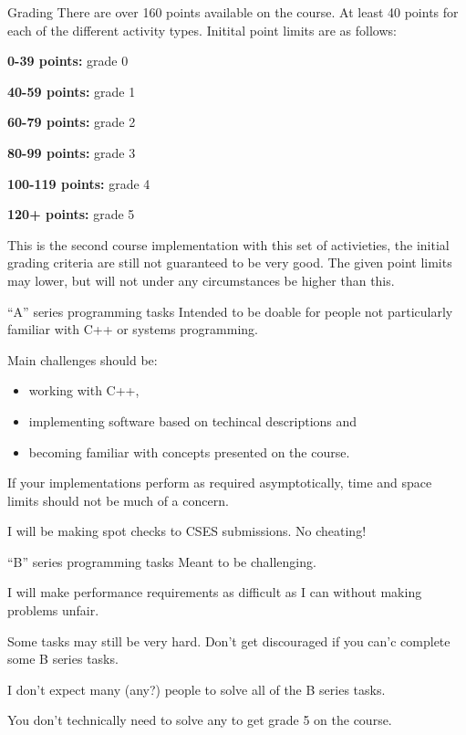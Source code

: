 \documentclass[11pt, aspectratio=169, table]{beamer}
\begin{document}
\begin{frame}{Grading}
There are over 160 points available on the course. At least 40 points for each of the different
activity types. Initital point limits are as follows:
\begin{description}
\item{{\bf 0-39 points:}} grade 0
\item{{\bf 40-59 points:}} grade 1
\item{{\bf 60-79 points:}} grade 2
\item{{\bf 80-99 points:}} grade 3
\item{{\bf 100-119 points:}} grade 4
\item{{\bf 120+ points:}} grade 5
\end{description}

This is the second course implementation with this set of activieties, the initial grading criteria 
are still not guaranteed to be very good. The given point limits may lower, but will not under any 
circumstances be higher than this.
\end{frame}

\begin{frame}{``A'' series programming tasks}
\setlength\parskip{\fill}
Intended to be doable for people not particularly familiar with C++ or systems programming.

Main challenges should be:
\begin{itemize}
	\item working with C++,
	\item implementing software based on techincal descriptions and
	\item becoming familiar with concepts presented on the course.
\end{itemize}

If your implementations perform as required asymptotically, time and space limits should not be much of a concern.

I will be making spot checks to CSES submissions. No cheating!
\end{frame}

\begin{frame}{``B'' series programming tasks} 
\setlength\parskip{\fill}
Meant to be challenging.

I will make performance requirements as difficult as I can without making problems unfair.

Some tasks may still be very hard. Don't get discouraged if you can'c complete some B series tasks.

I don't expect many (any?) people to solve all of the B series tasks.

You don't technically need to solve any to get grade 5 on the course.
\end{frame}
\end{document}
